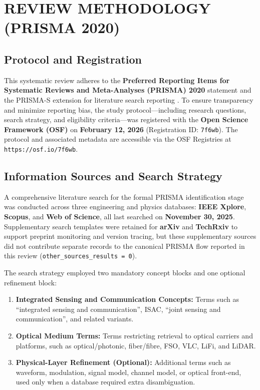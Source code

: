 \section{REVIEW METHODOLOGY (PRISMA 2020)}

\subsection{Protocol and Registration}
This systematic review adheres to the \textbf{Preferred Reporting Items for Systematic Reviews and Meta-Analyses (PRISMA) 2020} statement \cite{PRISMA2020} and the PRISMA-S extension for literature search reporting \cite{PRISMAS2021}. To ensure transparency and minimize reporting bias, the study protocol---including research questions, search strategy, and eligibility criteria---was registered with the \textbf{Open Science Framework (OSF)} on \textbf{February 12, 2026} (Registration ID: \texttt{7f6wb}). The protocol and associated metadata are accessible via the OSF Registries at \texttt{https://osf.io/7f6wb}.

\subsection{Information Sources and Search Strategy}
A comprehensive literature search for the formal PRISMA identification stage was conducted across three engineering and physics databases: \textbf{IEEE Xplore}, \textbf{Scopus}, and \textbf{Web of Science}, all last searched on \textbf{November 30, 2025}. Supplementary search templates were retained for \textbf{arXiv} and \textbf{TechRxiv} to support preprint monitoring and version tracing, but these supplementary sources did not contribute separate records to the canonical PRISMA flow reported in this review (\texttt{other\_sources\_results = 0}).

The search strategy employed two mandatory concept blocks and one optional refinement block:
\begin{enumerate}
    \item \textbf{Integrated Sensing and Communication Concepts:} Terms such as ``integrated sensing and communication'', ISAC, ``joint sensing and communication'', and related variants.
    \item \textbf{Optical Medium Terms:} Terms restricting retrieval to optical carriers and platforms, such as optical/photonic, fiber/fibre, FSO, VLC, LiFi, and LiDAR.
    \item \textbf{Physical-Layer Refinement (Optional):} Additional terms such as waveform, modulation, signal model, channel model, or optical front-end, used only when a database required extra disambiguation.
\end{enumerate}

